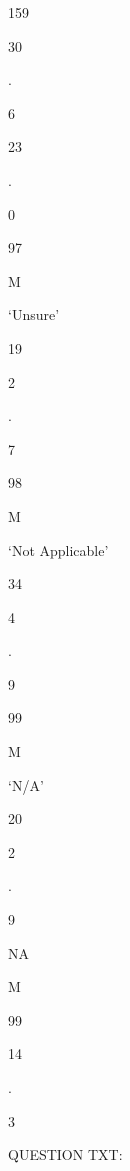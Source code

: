 \documentclass[
  letterpaper,
]{scrbook}
\begin{document}
159

30

.

6

23

.

0

97

M

`Unsure'

19

2

.

7

98

M

`Not Applicable'

34

4

.

9

99

M

`N/A'

20

2

.

9

NA

M

99

14

.

3

QUESTION TXT:
\end{document}
